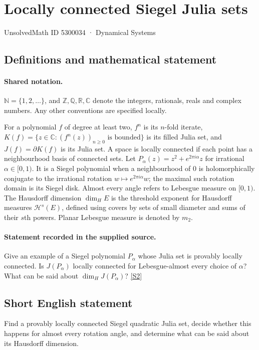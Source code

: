 \documentclass[11pt]{article}
\newcommand{\sref}[2]{\hyperlink{source:#1:#2}{[S#2]}}
\begin{document}
\setcounter{section}{5300033}
\section{Locally connected Siegel Julia sets}\label{5300034}
{\small\sffamily UnsolvedMath ID 5300034 · Dynamical Systems}
\subsection{Definitions and mathematical statement}

\paragraph{Shared notation.}$\mathbb N=\{1,2,\ldots\}$, and $\mathbb Z,\mathbb Q,\mathbb R,\mathbb C$ denote the integers, rationals, reals and complex numbers. Any other conventions are specified locally.


For a polynomial $f$ of degree at least two, $f^n$ is its $n$-fold iterate, $K(f)=\{z\in\mathbb C:(f^n(z))_{n\geq0}\text{ is bounded}\}$ is its filled Julia set, and $J(f)=\partial K(f)$ is its Julia set. A space is locally connected if each point has a neighbourhood basis of connected sets. Let $P_\alpha(z)=z^2+e^{2\pi i\alpha}z$ for irrational $\alpha\in[0,1)$. It is a Siegel polynomial when a neighbourhood of $0$ is holomorphically conjugate to the irrational rotation $w\mapsto e^{2\pi i\alpha}w$; the maximal such rotation domain is its Siegel disk. Almost every angle refers to Lebesgue measure on $[0,1)$. The Hausdorff dimension $\dim_H E$ is the threshold exponent for Hausdorff measures $\mathcal H^s(E)$, defined using covers by sets of small diameter and sums of their $s$th powers. Planar Lebesgue measure is denoted by $m_2$.
\paragraph{Statement recorded in the supplied source.}
Give an example of a Siegel polynomial $P_\alpha$ whose Julia set is provably locally connected. Is $J(P_\alpha)$ locally connected for Lebesgue-almost every choice of $\alpha$? What can be said about $\dim_HJ(P_\alpha)$? \sref{5300034}{2}
\subsection{Short English statement}
Find a provably locally connected Siegel quadratic Julia set, decide whether this happens for almost every rotation angle, and determine what can be said about its Hausdorff dimension.
\end{document}
